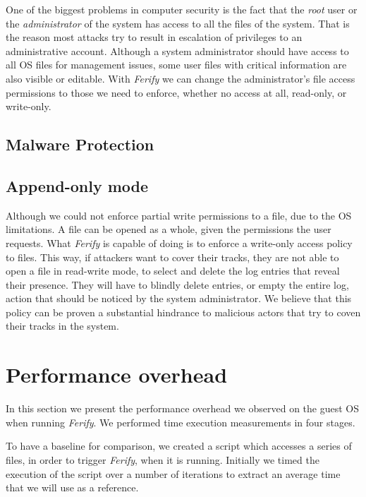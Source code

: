 \par One of the biggest problems in computer security is the fact that the \emph{root} user or the \emph{administrator} of the system has access to all the files of the system. That is the reason most attacks try to result in escalation of privileges to an administrative account. Although a system administrator should have access to all \ac{OS} files for management issues, some user files with critical information are also visible or editable. With \emph{Ferify} we can change the administrator's file access permissions to those we need to enforce, whether no access at all, read-only, or write-only.

\subsection{Malware Protection}

\subsection{Append-only mode}

\par Although we could not enforce partial write permissions to a file, due to the \ac{OS} limitations. A file can be opened as a whole, given the permissions the user requests. What \emph{Ferify} is capable of doing is to enforce a write-only access policy to files. This way, if attackers want to cover their tracks, they are not able to open a file in read-write mode, to select and delete the log entries that reveal their presence. They will have to blindly delete entries, or empty the entire log, action that should be noticed by the system administrator. We believe that this policy can be proven a substantial hindrance to malicious actors that try to coven their tracks in the system.

\section{Performance overhead}\label{sec:performance}

In this section we present the performance overhead we observed on the guest \ac{OS} when running \emph{Ferify}. We performed time execution measurements in four stages. 

\par To have a baseline for comparison, we created a script which accesses a series of files, in order to trigger \emph{Ferify}, when it is running. Initially we timed the execution of the script over a number of iterations to extract an average time that we will use as a reference. 


